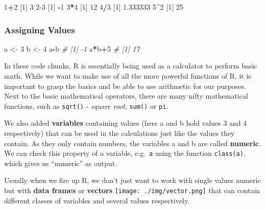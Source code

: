 \documentclass[
]{book}
\newenvironment{Shaded}{\begin{snugshade}}{\end{snugshade}}
\newcommand{\CommentTok}[1]{\textcolor[rgb]{0.56,0.35,0.01}{\textit{#1}}}
\newcommand{\DecValTok}[1]{\textcolor[rgb]{0.00,0.00,0.81}{#1}}
\newcommand{\FloatTok}[1]{\textcolor[rgb]{0.00,0.00,0.81}{#1}}
\newcommand{\NormalTok}[1]{#1}
\newcommand{\OtherTok}[1]{\textcolor[rgb]{0.56,0.35,0.01}{#1}}
\newcommand{\SpecialCharTok}[1]{\textcolor[rgb]{0.81,0.36,0.00}{\textbf{#1}}}
\begin{document}
\begin{Shaded}
\begin{Highlighting}[]
\DecValTok{1}\SpecialCharTok{+}\DecValTok{2} 
\NormalTok{  [}\DecValTok{1}\NormalTok{] }\DecValTok{3}
\DecValTok{2{-}3}
\NormalTok{  [}\DecValTok{1}\NormalTok{] }\SpecialCharTok{{-}}\DecValTok{1}
\DecValTok{3}\SpecialCharTok{*}\DecValTok{4}
\NormalTok{  [}\DecValTok{1}\NormalTok{] }\DecValTok{12}
\DecValTok{4}\SpecialCharTok{/}\DecValTok{3}
\NormalTok{  [}\DecValTok{1}\NormalTok{] }\FloatTok{1.333333}
\DecValTok{5}\SpecialCharTok{\^{}}\DecValTok{2}
\NormalTok{  [}\DecValTok{1}\NormalTok{] }\DecValTok{25}
\end{Highlighting}
\end{Shaded}

\subsubsection*{Assigning Values}\label{assigning-values}

\begin{Shaded}
\begin{Highlighting}[]
\NormalTok{a }\OtherTok{\textless{}{-}} \DecValTok{3}
\NormalTok{b }\OtherTok{\textless{}{-}} \DecValTok{4}
\NormalTok{a}\SpecialCharTok{{-}}\NormalTok{b}
\CommentTok{\# [1] {-}1}
\NormalTok{a}\SpecialCharTok{*}\NormalTok{b}\SpecialCharTok{+}\DecValTok{5}
\CommentTok{\# [1] 17}
\end{Highlighting}
\end{Shaded}

In these code chunks, R is essentially being used as a calculator to perform basic math.
While we want to make use of all the more powerful functions of R, it is important to grasp the basics and be able to use arithmetic for our purposes.
Next to the basic mathematical operators, there are many nifty mathematical functions, such as \texttt{sqrt()} - \emph{square root}, \texttt{sum()} or \texttt{pi}.

We also added \textbf{variables} containing values (here a and b hold values 3 and 4 respectively) that can be used in the calculations just like the values they contain.
As they only contain numbers, the variables a and b are called \textbf{numeric}.
We can check this property of a variable, e.g.~\texttt{a} using the function \texttt{class(a)}, which gives us ``numeric'' as output.

Usually when we fire up R, we don't just want to work with single values numeric but with \textbf{data frames} or \textbf{vectors} \texttt{[image: ./img/vector.png]} that can contain different classes of variables and several values respectively.
\end{document}
